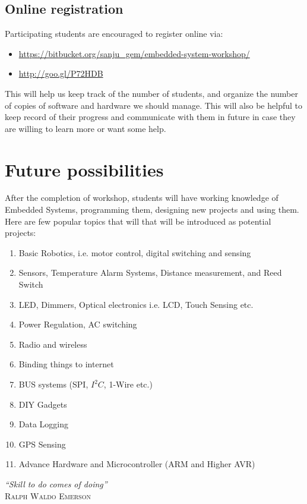 \documentclass[12pt]{article} %
\begin{document}
\subsection{Online registration} %
Participating students are encouraged to register online via: 
\begin{itemize}
\item \url{https://bitbucket.org/sanju_gem/embedded-system-workshop/}
\item \url{http://goo.gl/P72HDB}
\end{itemize}
This will help us keep track of the number of students, and organize the number of copies of software and hardware we should manage. This will also be helpful to keep record of their progress and communicate with them in future in case they are willing to learn more or want some help.

\section{Future possibilities} %
After the completion of workshop, students will have working knowledge of Embedded Systems, programming them, designing new projects and using them. Here are few popular topics that will that will be introduced as potential projects:
\begin{enumerate}
\item Basic Robotics, i.e. motor control, digital switching and sensing
\item Sensors, Temperature Alarm Systems, Distance measurement, and Reed Switch
\item LED, Dimmers, Optical electronics i.e. LCD, Touch Sensing etc.
\item Power Regulation, AC switching
\item Radio and wireless
\item Binding things to internet  
\item BUS systems (SPI, $I^2C$, 1-Wire etc.)
\item DIY Gadgets
\item Data Logging
\item GPS Sensing
\item Advance Hardware and Microcontroller (ARM and Higher AVR)
\end{enumerate}
\vspace{0.5cm}
\emph{\large “Skill to do comes of doing”}\\
\textsc {Ralph Waldo Emerson}
\end{document}
